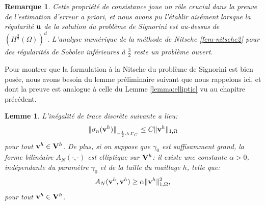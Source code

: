 \documentclass[11pt]{book}
\newtheorem{lemma}[theorem]{Lemme}
\newtheorem{remark}[theorem]{Remarque}
\newcommand{\beq}{\begin{eqnarray}}
\newcommand{\eeq}{\end{eqnarray}}
\newcommand{\br}{\begin{remark}}
\newcommand{\er}{\end{remark}}
\newcommand{\bl}{\begin{lemma}}
\newcommand{\el}{\end{lemma}}
\def\u{{\bf u}}
\def\vv{{\bf v}}
\def\V{{\bf V}}
\newcommand{\Gc}{\Gamma_{C}}
\newcommand{\sn}{{\sigma_n}}
\newcommand{\Agh}{A_{N}}
\newcommand{\nngc}[1]{\|{#1}\|_{_{-\frac12,h,\Gc}}}
\begin{document}
\br
Cette propriété de consistance joue un rôle crucial dans la preuve de l'estimation d'erreur {\it a priori}, et nous avons pu l'établir aisément lorsque la régularité $\u$ de la solution du problème de Signorini est au-dessus de $(H^{\frac32} (\Omega))^d$. L'analyse numérique de la méthode de Nitsche \eqref{fem-nitsche2} pour des régularités de Sobolev inférieures à $\frac32$ reste un problème ouvert.
\er
 
 
Pour montrer que la formulation à la Nitsche du problème de Signorini est bien posée, nous avons besoin du lemme préliminaire suivant que nous rappelons ici, et dont la preuve est analogue à celle du Lemme \ref{lemma:elliptic} vu au chapitre précédent.
% 
\bl
\label{lemma:elliptic2}
L'inégalité de trace discrète suivante a lieu:
\beq \label{invine2}
\nngc{\sn(\vv^h)}
\le C \Vert \vv^h \Vert_{1,\Omega}
\eeq
pour tout $\vv^h \in \V^h$.
De plus, 
si on suppose que $\gamma_0$ est suffisamment grand,
la forme bilinéaire $\Agh (\cdot,\cdot)$ est elliptique sur $\V^h$: il existe une constante $\alpha>0$, indépendante du paramètre $\gamma_0$ et de la taille du maillage $h$, telle que:
 \[
 \Agh (\vv^h,\vv^h) \geq \alpha \Vert \vv^h \Vert_{1,\Omega}^2,
 \]
 pour tout $\vv^h \in \V^h$.
\el
 
\end{document}
